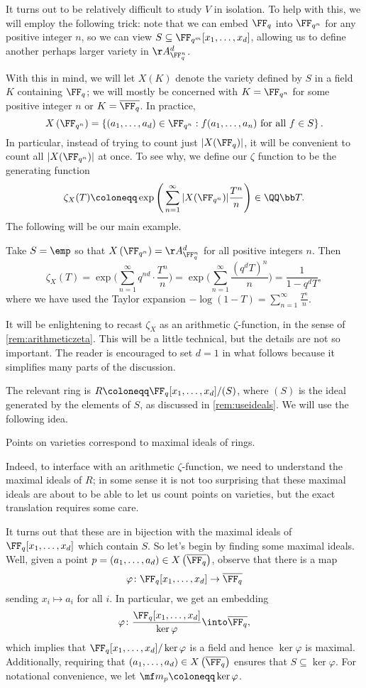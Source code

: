 \documentclass{article}
\begin{document}
It turns out to be relatively difficult to study $V$ in isolation. To help with this, we will employ the following trick: note that we can embed $\FF_q$ into $\FF_{q^n}$ for any positive integer $n$, so we can view $S\subseteq\FF_{q^m}[x_1,\ldots,x_d]$, allowing us to define another perhaps larger variety in $\AA_{\FF_q^n}^d$.

With this in mind, we will let $X\left(K\right)$ denote the variety defined by $S$ in a field $K$ containing $\FF_q$; we will mostly be concerned with $K=\FF_{q^n}$ for some positive integer $n$ or $K=\overline{\FF_q}$. In practice,
\[X\left(\FF_{q^n}\right)=\left\{(a_1,\ldots,a_d)\in\FF_{q^n}:f(a_1,\ldots,a_n)\text{ for all }f\in S\right\}.\]
In particular, instead of trying to count just $|X(\FF_q)|$, it will be convenient to count all $|X(\FF_{q^n})|$ at once. To see why, we define our $\zeta$ function to be the generating function
\[\zeta_X(T)\coloneqq\exp\Bigg(\sum_{n=1}^\infty|X(\FF_{q^n})|\frac{T^n}n\Bigg)\in\QQ\bb T.\]
The following will be our main example.
\begin{example}
	Take $S=\emp$ so that $X\left(\FF_{q^n}\right)=\AA_{\FF_q^n}^d$ for all positive integers $n$. Then
	\[\zeta_X(T)=\exp\Bigg(\sum_{n=1}^\infty q^{nd}\cdot\frac{T^n}n\Bigg)=\exp\Bigg(\sum_{n=1}^\infty\frac{\left(q^dT\right)^n}n\Bigg)=\frac1{1-q^dT},\]
	where we have used the Taylor expansion $-\log(1-T)=\sum_{n=1}^\infty\frac{T^n}n$.
\end{example}
It will be enlightening to recast $\zeta_X$ as an arithmetic $\zeta$-function, in the sense of \autoref{rem:arithmeticzeta}. This will be a little technical, but the details are not so important. The reader is encouraged to set $d=1$ in what follows because it simplifies many parts of the discussion.

The relevant ring is $R\coloneqq\FF_q[x_1,\ldots,x_d]/(S)$, where $(S)$ is the ideal generated by the elements of $S$, as discussed in \autoref{rem:useideals}. We will use the following idea.
\begin{idea}
	Points on varieties correspond to maximal ideals of rings.
\end{idea}
Indeed, to interface with an arithmetic $\zeta$-function, we need to understand the maximal ideals of $R$; in some sense it is not too surprising that these maximal ideals are about to be able to let us count points on varieties, but the exact translation requires some care.

It turns out that these are in bijection with the maximal ideals of $\FF_q[x_1,\ldots,x_d]$ which contain $S$. So let's begin by finding some maximal ideals. Well, given a point $p=(a_1,\ldots,a_d)\in X\left(\overline{\FF_{q}}\right)$, observe that there is a map
\[\varphi\colon\FF_q[x_1,\ldots,x_d]\to\overline{\FF_{q}}\]
sending $x_i\mapsto a_i$ for all $i$. In particular, we get an embedding
\[\varphi\colon\frac{\FF_q[x_1,\ldots,x_d]}{\ker\varphi}\into\overline{\FF_{q}},\]
which implies that $\FF_q[x_1,\ldots,x_d]/\ker\varphi$ is a field and hence $\ker\varphi$ is maximal. Additionally, requiring that $(a_1,\ldots,a_d)\in X\left(\overline{\FF_{q}}\right)$ ensures that $S\subseteq\ker\varphi$. For notational convenience, we let $\mf m_p\coloneqq\ker\varphi$.
\end{document}
